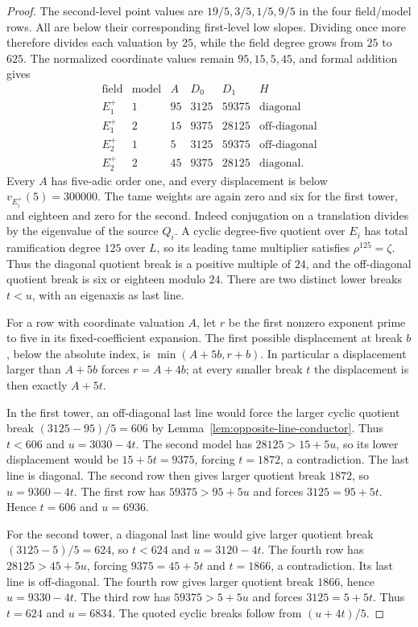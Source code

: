 \begin{proof}
The second-level point values are $19/5,3/5,1/5,9/5$ in the four field/model rows. All are below their corresponding first-level low slopes. Dividing once more therefore divides each valuation by $25$, while the field degree grows from $25$ to $625$. The normalized coordinate values remain $95,15,5,45$, and formal addition gives
\[
\begin{array}{c|c|r|r|r|c}
\text{field}&\text{model}&A&D_0&D_1&H\\\hline
E_1^+&1&95&3125&59375&\text{diagonal}\\
E_1^+&2&15&9375&28125&\text{off-diagonal}\\
E_2^+&1&5&3125&59375&\text{off-diagonal}\\
E_2^+&2&45&9375&28125&\text{diagonal}.
\end{array}
\]
Every $A$ has five-adic order one, and every displacement is below $v_{E_i^+}(5)=300000$. The tame weights are again zero and six for the first tower, and eighteen and zero for the second. Indeed conjugation on a translation divides by the eigenvalue of the source $Q_i$. A cyclic degree-five quotient over $E_i$ has total ramification degree $125$ over $L$, so its leading tame multiplier satisfies $\rho^{125}=\zeta$. Thus the diagonal quotient break is a positive multiple of $24$, and the off-diagonal quotient break is six or eighteen modulo $24$. There are two distinct lower breaks $t<u$, with an eigenaxis as last line.

For a row with coordinate valuation $A$, let $r$ be the first nonzero exponent prime to five in its fixed-coefficient expansion. The first possible displacement at break $b$, below the absolute index, is $\min(A+5b,r+b)$. In particular a displacement larger than $A+5b$ forces $r=A+4b$; at every smaller break $t$ the displacement is then exactly $A+5t$.

In the first tower, an off-diagonal last line would force the larger cyclic quotient break $(3125-95)/5=606$ by Lemma~\ref{lem:opposite-line-conductor}. Thus $t<606$ and $u=3030-4t$. The second model has $28125>15+5u$, so its lower displacement would be $15+5t=9375$, forcing $t=1872$, a contradiction. The last line is diagonal. The second row then gives larger quotient break $1872$, so $u=9360-4t$. The first row has $59375>95+5u$ and forces $3125=95+5t$. Hence $t=606$ and $u=6936$.

For the second tower, a diagonal last line would give larger quotient break $(3125-5)/5=624$, so $t<624$ and $u=3120-4t$. The fourth row has $28125>45+5u$, forcing $9375=45+5t$ and $t=1866$, a contradiction. Its last line is off-diagonal. The fourth row gives larger quotient break $1866$, hence $u=9330-4t$. The third row has $59375>5+5u$ and forces $3125=5+5t$. Thus $t=624$ and $u=6834$. The quoted cyclic breaks follow from $(u+4t)/5$.
\end{proof}

